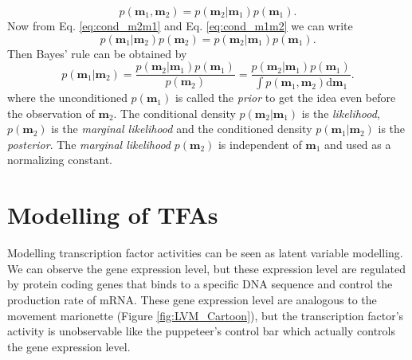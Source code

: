 \begin{equation}\label{eq:cond_m1m2}
 p\left(\textbf{m}_1,\textbf{m}_2\right) = p\left(\textbf{m}_2|\textbf{m}_1\right)p\left(\textbf{m}_1\right).
\end{equation}
Now from Eq. \ref{eq:cond_m2m1} and Eq. \ref{eq:cond_m1m2} we can write
\begin{equation}\label{eq:cond_m1m2joint}
 p\left(\textbf{m}_1|\textbf{m}_2\right)p\left(\textbf{m}_2\right) = p\left(\textbf{m}_2|\textbf{m}_1\right)p\left(\textbf{m}_1\right).
\end{equation}
Then Bayes' rule can be obtained by
\begin{equation}\label{eq:bayes_rule}
 p\left(\textbf{m}_1|\textbf{m}_2\right)= \frac{p\left(\textbf{m}_2|\textbf{m}_1\right)p\left(\textbf{m}_1\right)}{p\left(\textbf{m}_2\right)} = \frac{p\left(\textbf{m}_2|\textbf{m}_1\right)p\left(\textbf{m}_1\right)}{\int p\left(\textbf{m}_1,\textbf{m}_2\right) \text{d}\textbf{m}_1}.
\end{equation}
where the unconditioned $p\left(\textbf{m}_1\right)$ is called the \emph{prior} to get the idea even before the observation of $\textbf{m}_2$. The conditional density $p\left(\textbf{m}_2|\textbf{m}_1\right)$ is the \emph{likelihood}, $p\left(\textbf{m}_2\right)$ is the \emph{ marginal likelihood} and the conditioned density $p\left(\textbf{m}_1|\textbf{m}_2\right)$ is the \emph{ posterior}. The \emph{marginal likelihood} $p\left(\textbf{m}_2\right)$ is independent of $\textbf{m}_1$ and used as a normalizing constant. 


\section{Modelling of TFAs}
Modelling transcription factor activities can be seen as latent variable modelling. We can observe the gene expression level, but these expression level are regulated by protein coding genes that binds to a specific DNA sequence and control the production rate of mRNA. These gene expression level are analogous to the movement marionette (Figure \ref{fig:LVM_Cartoon}), but the transcription factor's activity is unobservable like the puppeteer's control bar which actually controls the gene expression level.

